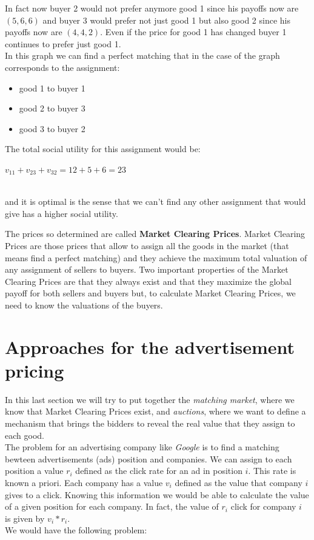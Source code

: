 \documentclass{article}
\begin{document}
In fact now buyer 2 would not prefer anymore good 1 since his payoffs now are $(5,6,6)$ and buyer 3 would prefer not just good 1 but also good 2 since his payoffs now are $(4,4,2)$. Even if the price for good 1 has changed buyer 1 continues to prefer just good 1.\\
In this graph we can find a perfect matching that in the case of the graph corresponds to the assignment: 
\begin{itemize}
	\item good 1 to buyer 1 
	\item good 2 to buyer 3 
	\item good 3 to buyer 2 
\end{itemize}

The total social utility for this assignment would be:\\

\centerline{$v_{11}+v_{23} +v_{32}=12+5+6=23$} \mbox{}\\
and it is optimal is the sense that we can't find any other assignment that would give has a higher social utility.

The prices so determined are called \textbf{Market Clearing Prices}. Market Clearing Prices are those prices that allow to assign all the goods in the market (that means find a perfect matching) and they achieve the maximum total valuation of any assignment of sellers to buyers. Two important properties of the Market Clearing Prices are that they always exist and that they maximize the global payoff for both sellers and buyers but, to calculate Market Clearing Prices, we need to know the valuations of the buyers. 
\section{Approaches for the advertisement pricing} In this last section we will try to put together the \textit{matching market}, where we know that Market Clearing Prices exist, and \textit{auctions}, where we want to define a mechanism that brings the bidders to reveal the real value that they assign to each good.\\
The problem for an advertising company like \textit{Google} is to find a matching bewteen advertisements (ads) position and companies. We can assign to each position a value $r_i$ defined as the click rate for an ad in position $i$. This rate is known a priori. Each company has a value $v_i$ defined as the value that company $i$ gives to a click. Knowing this information we would be able to calculate the value of a given position for each company. In fact, the value of $r_i$ click for company $i$ is given by $v_i*r_i$.\\
We would have the following problem:
\end{document}
